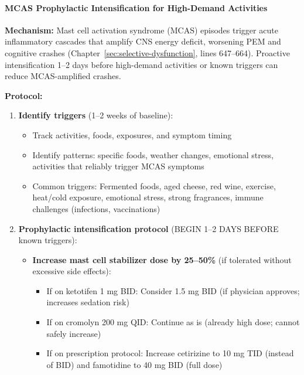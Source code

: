 \paragraph{MCAS Prophylactic Intensification for High-Demand Activities}

\begin{recommendation}
\label{rec:mcas-prophylaxis}

\textbf{Mechanism:} Mast cell activation syndrome (MCAS) episodes trigger acute inflammatory cascades that amplify CNS energy deficit, worsening PEM and cognitive crashes (Chapter~\ref{sec:selective-dysfunction}, lines 647--664). Proactive intensification 1--2 days before high-demand activities or known triggers can reduce MCAS-amplified crashes.

\textbf{Protocol:}

\begin{enumerate}
    \item \textbf{Identify triggers} (1--2 weeks of baseline):
    \begin{itemize}
        \item Track activities, foods, exposures, and symptom timing
        \item Identify patterns: specific foods, weather changes, emotional stress, activities that reliably trigger MCAS symptoms
        \item Common triggers: Fermented foods, aged cheese, red wine, exercise, heat/cold exposure, emotional stress, strong fragrances, immune challenges (infections, vaccinations)
    \end{itemize}

    \item \textbf{Prophylactic intensification protocol} (BEGIN 1--2 DAYS BEFORE known triggers):
    \begin{itemize}
        \item \textbf{Increase mast cell stabilizer dose by 25--50\%} (if tolerated without excessive side effects):
        \begin{itemize}
            \item If on ketotifen 1 mg BID: Consider 1.5 mg BID (if physician approves; increases sedation risk)
            \item If on cromolyn 200 mg QID: Continue as is (already high dose; cannot safely increase)
            \item If on prescription protocol: Increase cetirizine to 10 mg TID (instead of BID) and famotidine to 40 mg BID (full dose)
        \end{itemize}


\end{itemize}
\end{enumerate}
\end{recommendation}
